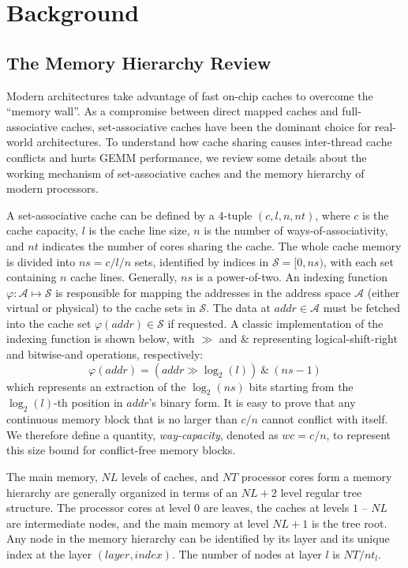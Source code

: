 \section{Background}\label{sec:background}

\subsection{The Memory Hierarchy Review}\label{subsec:hierarchy}

Modern architectures take advantage of fast on-chip caches
to overcome the ``memory wall''.
As a compromise between direct mapped caches
and full-associative caches,
set-associative caches have been the dominant choice for real-world architectures.
To understand how cache sharing causes
inter-thread cache conflicts
and hurts GEMM performance, we review some details
about the working mechanism of set-associative caches and
the memory hierarchy of modern processors.

A set-associative cache can be defined by a 4-tuple $(c, l, n, nt)$,
where $c$ is the cache capacity, $l$ is the cache line size,
$n$ is the number of ways-of-associativity,
and $nt$ indicates the number of cores sharing the cache.
The whole cache memory is divided into $ns=c/l/n$ sets,
identified by indices in $\mathcal{S} = [0, ns)$,
with each set containing $n$ cache lines.
Generally, $ns$ is a power-of-two.
An indexing function $\varphi: \mathcal{A} \mapsto \mathcal{S}$ is responsible for
mapping the addresses in the address space $\mathcal{A}$
(either virtual or physical) to the cache sets in
$\mathcal{S}$.
The data at $addr \in \mathcal{A}$ must be fetched
into the cache set $\varphi(addr) \in \mathcal{S}$ if requested.
A classic implementation of the indexing function is shown below,
with $\gg$ and $\&$ representing logical-shift-right and bitwise-and operations, respectively:
\begin{equation*}
  \varphi(addr) = (addr \gg \log_2(l)) ~\&~ (ns-1)
  \label{eq:phi}
\end{equation*}
which represents an extraction of the $\log_2(ns)$ bits starting from the $\log_2(l)$-th
position in $addr$'s binary form.
It is easy to prove that any continuous memory block
that is no larger than $c/n$
cannot conflict with itself.
We therefore define a quantity, \emph{way-capacity}, denoted as $wc=c/n$,
to represent this size bound for conflict-free memory blocks.

The main memory, $NL$ levels of caches, and $NT$ processor cores
form a memory hierarchy are generally organized in terms
of an $NL+2$ level regular tree structure.
The processor cores at level $0$ are leaves,
the caches at levels $1$ -- $NL$ are intermediate nodes,
and the main memory at level $NL+1$ is the tree root.
Any node in the memory hierarchy can be identified by
its layer and its unique index at the layer $(layer, index)$.
The number of nodes at layer $l$ is $NT / nt_l$.

